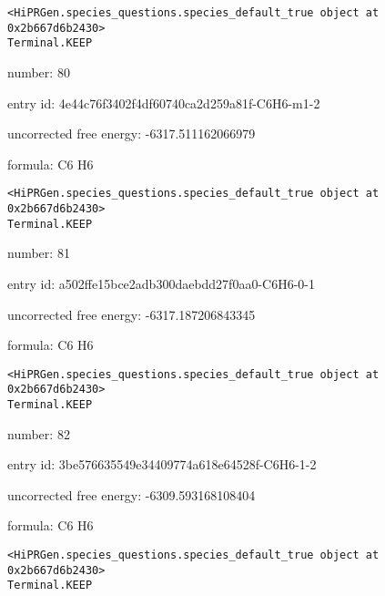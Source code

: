 \documentclass{article}
\begin{document}
\vspace{1cm}
\begin{verbatim}
<HiPRGen.species_questions.species_default_true object at 0x2b667d6b2430>
Terminal.KEEP
\end{verbatim}


number: 80



entry id: 4e44c76f3402f4df60740ca2d259a81f-C6H6-m1-2



uncorrected free energy: -6317.511162066979



formula: C6 H6


\vspace{1cm}
\begin{verbatim}
<HiPRGen.species_questions.species_default_true object at 0x2b667d6b2430>
Terminal.KEEP
\end{verbatim}


number: 81



entry id: a502ffe15bce2adb300daebdd27f0aa0-C6H6-0-1



uncorrected free energy: -6317.187206843345



formula: C6 H6


\vspace{1cm}
\begin{verbatim}
<HiPRGen.species_questions.species_default_true object at 0x2b667d6b2430>
Terminal.KEEP
\end{verbatim}


number: 82



entry id: 3be576635549e34409774a618e64528f-C6H6-1-2



uncorrected free energy: -6309.593168108404



formula: C6 H6


\vspace{1cm}
\begin{verbatim}
<HiPRGen.species_questions.species_default_true object at 0x2b667d6b2430>
Terminal.KEEP
\end{verbatim}
\end{document}
